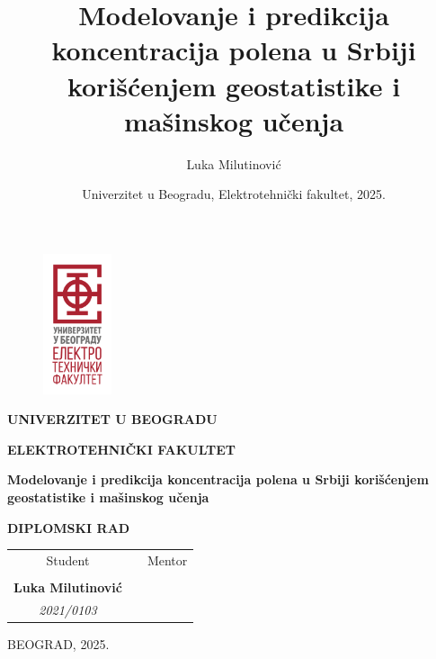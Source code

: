 \documentclass[12pt]{article}
\title{Modelovanje i predikcija koncentracija polena u Srbiji korišćenjem geostatistike i mašinskog učenja}
\author{Luka Milutinović}
\date{Univerzitet u Beogradu, Elektrotehnički fakultet, 2025.}
\begin{document}
\newpage

\begin{figure}[H]
    \centering
    \includegraphics[width=2cm]{grafici/etflogotip.png}

\end{figure}

\begin{center}
\large \textbf{UNIVERZITET U BEOGRADU}
\end{center}
\begin{center}
\large \textbf{ELEKTROTEHNIČKI FAKULTET}
\end{center}



\thispagestyle{empty}


\vspace*{3cm}
\begin{center}
\Huge \textbf{Modelovanje i predikcija koncentracija polena u Srbiji korišćenjem geostatistike i mašinskog učenja}
\end{center}


\begin{center}
\small \textbf{DIPLOMSKI RAD}
\end{center}


\vspace*{6cm}

\begin{center}

\begin{tabular}{ccc}
\large Student & \hspace*{3cm} & \large Mentor \\
 & & \\
\large\textbf{Luka Milutinović} & & \large\textbf{} \\
\large\textsl{2021/0103} & & \large\textsl{} \\

\end{tabular}
\end{center}

\vspace*{0.9cm}

\begin{center}
\normalsize	 BEOGRAD,  2025.
\end{center}
\end{document}
